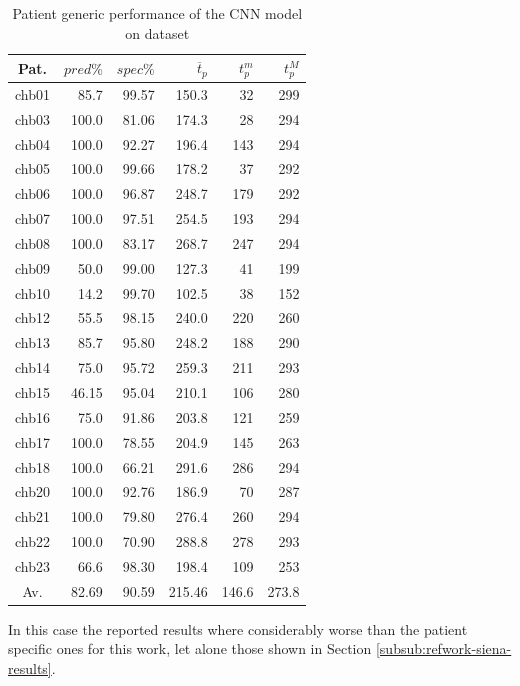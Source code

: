 \begin{table}[ht]
    \centering
    \begin{tabular}{c|rrrrr}
    Pat.  & $pred\%$ & $spec\%$ & $\overline{t}_p$   & $t_p^m$  & $t_p^M$   \\ \hline
    chb01 & 85.7   & 99.57  & 150.3  & 32    & 299   \\
    chb03 & 100.0  & 81.06  & 174.3  & 28    & 294   \\
    chb04 & 100.0  & 92.27  & 196.4  & 143   & 294   \\
    chb05 & 100.0  & 99.66  & 178.2  & 37    & 292   \\
    chb06 & 100.0  & 96.87  & 248.7  & 179   & 292   \\
    chb07 & 100.0  & 97.51  & 254.5  & 193   & 294   \\
    chb08 & 100.0  & 83.17  & 268.7  & 247   & 294   \\
    chb09 & 50.0   & 99.00  & 127.3  & 41    & 199   \\
    chb10 & 14.2   & 99.70  & 102.5  & 38    & 152   \\
    chb12 & 55.5   & 98.15  & 240.0  & 220   & 260   \\
    chb13 & 85.7   & 95.80  & 248.2  & 188   & 290   \\
    chb14 & 75.0   & 95.72  & 259.3  & 211   & 293   \\
    chb15 & 46.15  & 95.04  & 210.1  & 106   & 280   \\
    chb16 & 75.0   & 91.86  & 203.8  & 121   & 259   \\
    chb17 & 100.0  & 78.55  & 204.9  & 145   & 263   \\
    chb18 & 100.0  & 66.21  & 291.6  & 286   & 294   \\
    chb20 & 100.0  & 92.76  & 186.9  & 70    & 287   \\
    chb21 & 100.0  & 79.80  & 276.4  & 260   & 294   \\
    chb22 & 100.0  & 70.90  & 288.8  & 278   & 293   \\
    chb23 & 66.6   & 98.30  & 198.4  & 109   & 253   \\ \hline
    Av.   & 82.69  & 90.59  & 215.46 & 146.6 & 273.8 \\ \hline
    \end{tabular}
    \caption{Patient generic performance of the \gls{CNN} model on  dataset}
    \label{tab:cnn-results-generic} 
\end{table}

In this case the reported results where considerably worse than the patient specific ones for this work, let alone those shown in Section \ref{subsub:refwork-siena-results}.

